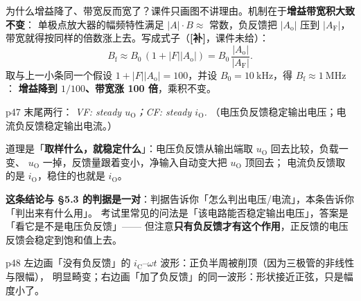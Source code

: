 \documentclass[11pt]{ctexart}
\begin{document}
为什么增益降了、带宽反而宽了？课件只画图不讲理由。机制在于\textbf{增益带宽积大致不变}：
单极点放大器的幅频特性满足 $|A|\cdot B\approx$ 常数，负反馈把 $|A_{\mathrm{o}}|$ 压到 $|A_{\mathrm{F}}|$，
带宽就得按同样的倍数涨上去。写成式子（\textbf{[补]}，课件未给）：
\[
B_{\mathrm{f}}\approx B_0\,(1+|F||A_{\mathrm{o}}|)
=B_0\,\frac{|A_{\mathrm{o}}|}{|A_{\mathrm{F}}|} .
\]
取与上一小条同一个假设 $1+|F||A_{\mathrm{o}}|=100$，并设 $B_0=10\ \mathrm{kHz}$，得 $B_{\mathrm{f}}\approx1\ \mathrm{MHz}$：
\textbf{增益降到 $1/100$、带宽涨 100 倍}，乘积不变。


p47 末尾两行：
\textit{VF: steady $u_{\mathrm{O}}$；CF: steady $i_{\mathrm{O}}$.}
（电压负反馈稳定输出电压；电流负反馈稳定输出电流。）

道理是「\textbf{取样什么，就稳定什么}」：电压负反馈从输出端取 $u_{\mathrm{O}}$ 回去比较，负载一变、
$u_{\mathrm{O}}$ 一掉，反馈量跟着变小，净输入自动变大把 $u_{\mathrm{O}}$ 顶回去；
电流负反馈取的是 $i_{\mathrm{O}}$，稳住的也就是 $i_{\mathrm{O}}$。

\begin{wbx}
\textbf{这条结论与 §5.3 的判据是一对}：判据告诉你「怎么判出电压/电流」，本条告诉你「判出来有什么用」。
考试里常见的问法是「该电路能否稳定输出电压」，答案是「看它是不是电压负反馈」——
但注意\textbf{只有负反馈才有这个作用}，正反馈的电压反馈会稳定到饱和值上去。
\end{wbx}


p48 左边画「没有负反馈」的 $i_{\mathrm{C}}$--$\omega t$ 波形：正负半周被削顶（因为三极管的非线性与限幅），
明显畸变；右边画「加了负反馈」的同一波形：形状接近正弦，只是幅度小了。
\end{document}
